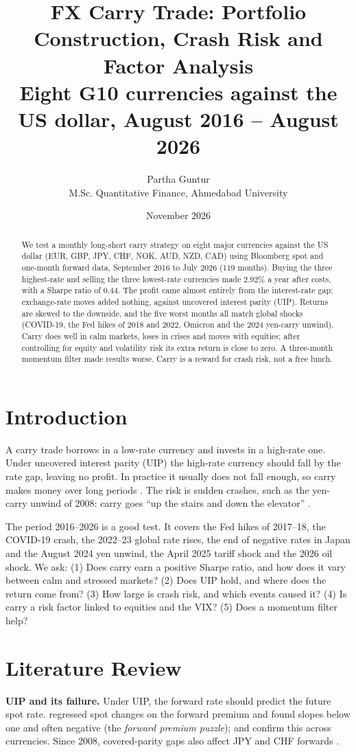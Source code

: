 \documentclass[11pt,a4paper]{article}
\title{\textbf{FX Carry Trade: Portfolio Construction, Crash Risk and Factor Analysis}\\[0.3em]
\large Eight G10 currencies against the US dollar, August 2016 -- August 2026}
\author{Partha Guntur\\ \small M.Sc. Quantitative Finance, Ahmedabad University}
\date{November 2026}
\begin{document}
\maketitle

\begin{abstract}
\noindent We test a monthly long-short carry strategy on eight major currencies against the US dollar (EUR, GBP, JPY, CHF,
NOK, AUD, NZD, CAD) using Bloomberg spot and one-month forward data, September 2016 to July 2026 (119 months). Buying the
three highest-rate and selling the three lowest-rate currencies made 2.92\% a year after costs, with a Sharpe ratio of 0.44.
The profit came almost entirely from the interest-rate gap; exchange-rate moves added nothing, against uncovered interest
parity (UIP). Returns are skewed to the downside, and the five worst months all match global shocks (COVID-19, the Fed hikes
of 2018 and 2022, Omicron and the 2024 yen-carry unwind). Carry does well in calm markets, loses in crises and moves with
equities; after controlling for equity and volatility risk its extra return is close to zero. A three-month momentum filter
made results worse. Carry is a reward for crash risk, not a free lunch.
\end{abstract}

\section{Introduction}
A carry trade borrows in a low-rate currency and invests in a high-rate one. Under uncovered interest parity (UIP) the
high-rate currency should fall by the rate gap, leaving no profit. In practice it usually does not fall enough, so carry
makes money over long periods \citep{fama1984,engel1996,lrv2011}. The risk is sudden crashes, such as the yen-carry unwind
of 2008: carry goes ``up the stairs and down the elevator'' \citep{bnp2009}.

The period 2016--2026 is a good test. It covers the Fed hikes of 2017--18, the COVID-19 crash, the 2022--23 global rate
rises, the end of negative rates in Japan and the August 2024 yen unwind, the April 2025 tariff shock and the 2026 oil
shock. We ask: (1) Does carry earn a positive Sharpe ratio, and how does it vary between calm and stressed markets?
(2) Does UIP hold, and where does the return come from? (3) How large is crash risk, and which events caused it?
(4) Is carry a risk factor linked to equities and the VIX? (5) Does a momentum filter help?

\section{Literature Review}
\textbf{UIP and its failure.} Under UIP, the forward rate should predict the future spot rate. \citet{fama1984} regressed
spot changes on the forward premium and found slopes below one and often negative (the \emph{forward premium puzzle});
\citet{hansenhodrick1980} and \citet{engel1996} confirm this across currencies. Since 2008, covered-parity gaps also affect
JPY and CHF forwards \citep{dtv2018}.
\end{document}
